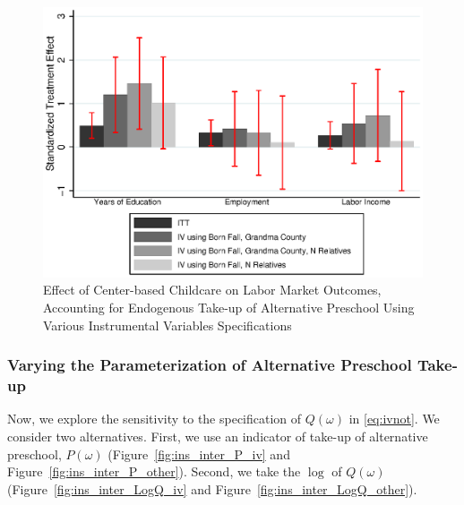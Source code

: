 \begin{appendices}
\begin{figure}[H]
		\caption{Effect of Center-based Childcare on Labor Market Outcomes, Accounting for Endogenous Take-up of Alternative Preschool Using Various Instrumental Variables Specifications} \label{fig:inter_Q_other}
		\includegraphics[width=.7\columnwidth]{output/appendixplots/inter_Q_iv_other.eps}
\end{figure}

\subsubsection{Varying the Parameterization of Alternative Preschool Take-up}

\noindent Now, we explore the sensitivity to the specification of $Q(\omega)$ in \eqref{eq:ivnot}. We consider two alternatives. First, we use an indicator of take-up of alternative preschool, $P(\omega)$ (Figure~\ref{fig:ins_inter_P_iv} and Figure~\ref{fig:ins_inter_P_other}). Second, we take the $\log$ of $Q(\omega)$ (Figure~\ref{fig:ins_inter_LogQ_iv} and Figure~\ref{fig:ins_inter_LogQ_other}).


\end{appendices}
